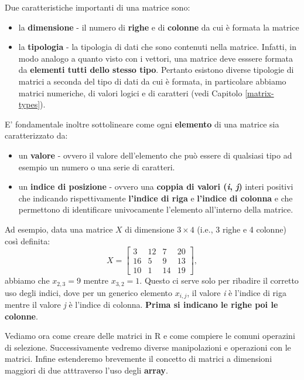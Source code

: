 \documentclass[
]{book}
\providecommand{\tightlist}{%
  \setlength{\itemsep}{0pt}\setlength{\parskip}{0pt}}
\begin{document}
Due caratteristiche importanti di una matrice sono:

\begin{itemize}
\tightlist
\item
  la \textbf{dimensione} - il numero di \textbf{righe} e di \textbf{colonne} da cui è formata la matrice
\item
  la \textbf{tipologia} - la tipologia di dati che sono contenuti nella matrice. Infatti, in modo analogo a quanto visto con i vettori, una matrice deve esssere formata da \textbf{elementi tutti dello stesso tipo}. Pertanto esistono diverse tipologie di matrici a seconda del tipo di dati da cui è formata, in particolare abbiamo matrici numeriche, di valori logici e di caratteri (vedi Capitolo \ref{matrix-types}).
\end{itemize}

E' fondamentale inoltre sottolineare come ogni \textbf{elemento} di una matrice sia caratterizzato da:

\begin{itemize}
\tightlist
\item
  un \textbf{valore} - ovvero il valore dell'elemento che può essere di qualsiasi tipo ad esempio un numero o una serie di caratteri.
\item
  un \textbf{indice di posizione} - ovvero una \textbf{coppia di valori (\emph{i}, \emph{j})} interi positivi che indicando rispettivamente \textbf{l'indice di riga} e \textbf{l'indice di colonna} e che permettono di identificare univocamente l'elemento all'interno della matrice.
\end{itemize}

Ad esempio, data una matrice \(X\) di dimensione \(3\times4\) (i.e., 3 righe e 4 colonne) così definita:
\[
 X = 
\begin{bmatrix}
3 & 12 & 7 & 20\\
16 & 5 & 9 & 13\\
10 & 1 & 14 & 19
\end{bmatrix},
\]
abbiamo che \(x_{2, 3} = 9\) mentre \(x_{3, 2} = 1\). Questo ci serve solo per ribadire il corretto uso degli indici, dove per un generico elemento \(x_{i, j}\), il valore \emph{i} è l'indice di riga mentre il valore \emph{j} è l'indice di colonna. \textbf{Prima si indicano le righe poi le colonne}.

Vediamo ora come creare delle matrici in R e come compiere le comuni operazini di selezione. Successivamente vedremo diverse manipolazioni e operazioni con le matrici. Infine estenderemo brevemente il concetto di matrici a dimensioni maggiori di due atttraverso l'uso degli \textbf{array}.
\end{document}
